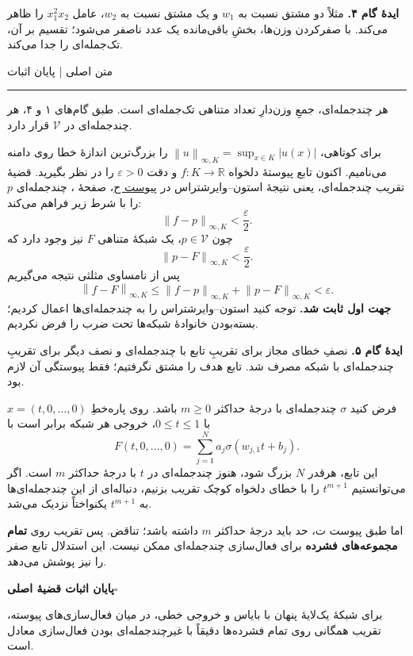 \documentclass[12pt,a4paper]{article}
\newcommand{\R}{\mathbb R}
\newcommand{\V}{\mathcal V}
\newcommand{\normK}[1]{\left\lVert #1\right\rVert_{\infty,K}}
\newcommand{\heading}[1]{\par\Needspace{5\baselineskip}\vspace{5pt}{\large\bfseries #1\par}\nobreak\vspace{2pt}}
\newcommand{\ribbon}[1]{{\small #1\par}\vspace{-3pt}\hrule\vspace{8pt}}
\newcommand{\appref}[2]{\hyperref[#1]{پیوست #2}، صفحهٔ \pageref{#1}}
\begin{document}
\begin{intuition}
\textbf{ایدهٔ گام ۴.} مثلاً دو مشتق نسبت به $w_1$ و یک مشتق نسبت به $w_2$، عامل $x_1^2x_2$ را ظاهر می‌کند. با صفرکردن وزن‌ها، بخشِ باقی‌مانده یک عدد ناصفر می‌شود؛ تقسیم بر آن، تک‌جمله‌ای را جدا می‌کند.
\end{intuition}

\clearpage
{}\label{step:five}
\ribbon{متن اصلی | پایان اثبات}
\heading{گام ۵. از چندجمله‌ای به تابع هدف می‌رسیم}
هر چندجمله‌ای، جمعِ وزن‌دارِ تعداد متناهی تک‌جمله‌ای است. طبق گام‌های ۱ و ۴، هر چندجمله‌ای در $\V$ قرار دارد.

برای کوتاهی، $\normK{u}=\sup_{x\in K}|u(x)|$ را بزرگ‌ترین اندازهٔ خطا روی دامنه می‌نامیم. اکنون تابع پیوستهٔ دلخواه $f:K\to\R$ و دقت $\varepsilon>0$ را در نظر بگیرید. قضیهٔ تقریب چندجمله‌ای، یعنی نتیجهٔ استون–وایرشتراس در \appref{app:stone}{ح}، چندجمله‌ای $p$ را با شرط زیر فراهم می‌کند:
\[
\normK{f-p}<\frac{\varepsilon}{2}.
\]
چون $p\in\V$، یک شبکهٔ متناهی $F$ نیز وجود دارد که
\[
\normK{p-F}<\frac{\varepsilon}{2}.
\]
پس از نامساوی مثلثی نتیجه می‌گیریم
\[
\normK{f-F}\leq\normK{f-p}+\normK{p-F}<\varepsilon.
\]
\textbf{جهت اول ثابت شد.} توجه کنید استون–وایرشتراس را به چندجمله‌ای‌ها اعمال کردیم؛ بسته‌بودن خانوادهٔ شبکه‌ها تحت ضرب را فرض نکردیم.

\begin{intuition}
\textbf{ایدهٔ گام ۵.} نصفِ خطای مجاز برای تقریبِ تابع با چندجمله‌ای و نصف دیگر برای تقریبِ چندجمله‌ای با شبکه مصرف شد. تابع هدف را مشتق نگرفتیم؛ فقط پیوستگی آن لازم بود.
\end{intuition}

\label{main:necessary}
\heading{جهت دوم: فعال‌سازی چندجمله‌ای کافی نیست}
فرض کنید $\sigma$ چندجمله‌ای با درجهٔ حداکثر $m\geq0$ باشد. روی پاره‌خطِ $x=(t,0,\ldots,0)$ با $0\leq t\leq1$، خروجی هر شبکه برابر است با
\[
F(t,0,\ldots,0)=\sum_{j=1}^{N}a_j\sigma(w_{j,1}t+b_j).
\]
این تابع، هرقدر $N$ بزرگ شود، هنوز چندجمله‌ای در $t$ با درجهٔ حداکثر $m$ است. اگر می‌توانستیم $t^{m+1}$ را با خطای دلخواه کوچک تقریب بزنیم، دنباله‌ای از این چندجمله‌ای‌ها به $t^{m+1}$ یکنواختاً نزدیک می‌شد.

اما طبق پیوست ت، حد باید درجهٔ حداکثر $m$ داشته باشد؛ تناقض. پس تقریب روی \textbf{تمام مجموعه‌های فشرده} برای فعال‌سازی چندجمله‌ای ممکن نیست. این استدلال تابع صفر را نیز پوشش می‌دهد.

\label{main:end}
\begin{mainbox}
\textbf{پایان اثبات قضیهٔ اصلی}\hfill$\square$

برای شبکهٔ یک‌لایهٔ پنهان با بایاس و خروجی خطی، در میان فعال‌سازی‌های پیوسته، تقریب همگانی روی تمام فشرده‌ها دقیقاً با غیرچندجمله‌ای بودن فعال‌سازی معادل است.
\end{mainbox}


\end{document}
